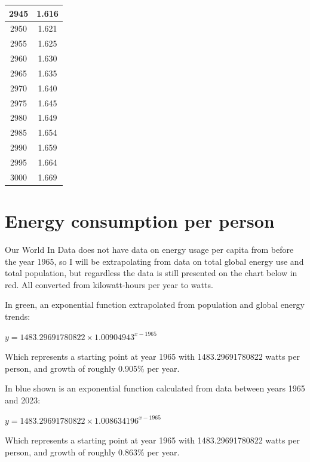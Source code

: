 \documentclass[a4paper]{article}
\begin{document}
\begin{tabular}{|c|c|}
		\hline
		2945 & 1.616 \\
		\hline
		2950 & 1.621 \\
		\hline
		2955 & 1.625 \\
		\hline
		2960 & 1.630 \\
		\hline
		2965 & 1.635 \\
		\hline
		2970 & 1.640 \\
		\hline
		2975 & 1.645 \\
		\hline
		2980 & 1.649 \\
		\hline
		2985 & 1.654 \\
		\hline
		2990 & 1.659 \\
		\hline
		2995 & 1.664 \\
		\hline
		3000 & 1.669 \\
		\hline
	\end{tabular}
	
	\normalsize
	
	\pagebreak
	
	\section{Energy consumption per person}
	
	Our World In Data does not have data on energy usage per capita from before the year 1965, so I will be extrapolating from data on total global energy use and total population, but regardless the data is still presented on the chart below in red. All converted from kilowatt-hours per year to watts.
	
	\bigskip
	
	In green, an exponential function extrapolated from population and global energy trends:
	
	
	\begin{center}
		{\large $ y = 1483.29691780822 \times 1.00904943^{x-1965} $}
	\end{center}
	
	\noindent Which represents a starting point at year 1965 with 1483.29691780822 watts per person, and growth of roughly 0.905\% per year.
	
	\medskip
	
	In blue shown is an exponential function calculated from data between years 1965 and 2023:
	
	\begin{center}
		{\large $ y = 1483.29691780822 \times 1.008634196^{x-1965} $}
	\end{center}
	
	\noindent Which represents a starting point at year 1965 with 1483.29691780822 watts per person, and growth of roughly 0.863\% per year.
	
\end{document}
